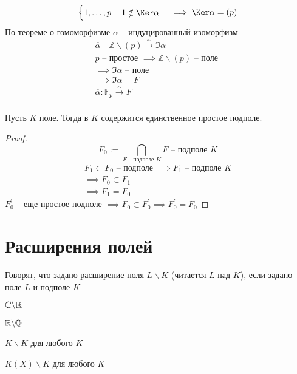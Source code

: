 \documentclass[main]{subfiles}
\begin{document}
\begin{longProof}
\begin{enumerate}
\begin{gather*}
\begin{cases}
                1, \ldots, p-1 \notin \Ker \alpha
            \end{cases} \implies \Ker \alpha = (p)
        \end{gather*}
        По теореме о гомоморфизме $\alpha$ -- индуцированный изоморфизм 
        \begin{gather*}
            \overline{\alpha} \quad \mathbb{Z} \backslash (p) \xrightarrow{\sim} \Im \alpha \\
            p \text{ -- простое } \implies \mathbb{Z} \backslash (p) \text{ -- поле } \\
            \implies \Im \alpha \text{ -- поле} \\
            \implies \Im \alpha = F \\
            \overline{\alpha}: \mathbb{F}_p \xrightarrow{\sim} F\\
        \end{gather*}
    \end{enumerate}
\end{longProof}

\begin{proposition}
    Пусть $K$ поле. Тогда в $K$ содержится единственное простое подполе.
\end{proposition}
\begin{proof}
    \[ F_0 := \bigcap_{F \text{ -- подполе } K} F \text{ -- подполе } K \]
    \begin{gather*}
        F_1 \subset F_0 \text{ -- подполе } \implies F_1 \text{ -- подполе } K \\
        \implies F_0 \subset F_1 \\
        \implies F_1 = F_0
    \end{gather*} 
    $F_0^\prime$ -- еще простое подполе $ \implies  F_0 \subset F^\prime_0 \implies F^\prime_0 = F_0$ 
\end{proof}

\chapter*{Расширения полей}
\begin{definition}
    Говорят, что задано расширение поля $L \backslash K$ (читается $L$ над $K$),
     если задано поле $L$ и подполе $K$
\end{definition}

\begin{example}
    $\mathbb{C} \backslash \mathbb{R}$
\end{example}
\begin{example}
    $ \mathbb{R} \backslash \mathbb{Q} $
\end{example}
\begin{example}
    $ K \backslash K$ для любого $K$
\end{example}
\begin{example}
    $K(X) \backslash K $ для любого $K$
\end{example}
\end{document}
